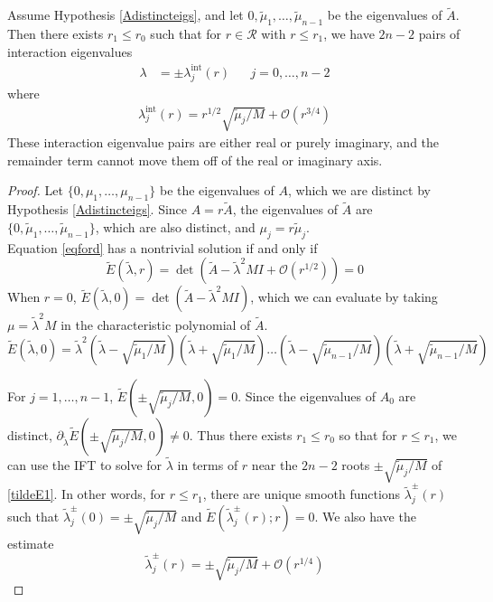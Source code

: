 \documentclass[thesis.tex]{subfiles}
\begin{document}
\begin{lemma}\label{inteigslemma}
Assume Hypothesis \ref{Adistincteigs}, and let $0, \tilde{\mu}_1, \dots, \tilde{\mu}_{n-1}$ be the eigenvalues of $\tilde{A}$. Then there exists $r_1 \leq r_0$ such that for $r \in \mathcal{R}$ with $r \leq r_1$, we have $2n - 2$ pairs of interaction eigenvalues
\begin{align*}
\lambda &= \pm \lambda^{\text{int}}_j(r) && j = 0, \dots, n-2
\end{align*}
where
\begin{align}\label{inteigsformula}
\lambda^{\text{int}}_j(r) = r^{1/2} \sqrt{\tilde{\mu}_j / M} + \mathcal{O}(r^{3/4})
\end{align}
These interaction eigenvalue pairs are either real or purely imaginary, and the remainder term cannot move them off of the real or imaginary axis.

\begin{proof}
Let $\{0, \mu_1, \dots, \mu_{n-1}\}$ be the eigenvalues of $A$, which we are distinct by Hypothesis \ref{Adistincteigs}. Since $A = r \tilde{A}$, the eigenvalues of $\tilde{A}$ are $\{0, \tilde{\mu}_1, \dots, \tilde{\mu}_{n-1}\}$, which are also distinct, and $\mu_j = r \tilde{\mu}_j$.\\

Equation \eqref{eqford} has a nontrivial solution if and only if
\[
\tilde{E}(\tilde{\lambda}, r) = \det
\left( \tilde{A} - \tilde{\lambda}^2 MI + \mathcal{O}(r^{1/2}) \right) = 0
\]
When $r = 0$, $\tilde{E}(\tilde{\lambda}, 0) = \det(\tilde{A} - \tilde{\lambda}^2 MI)$, which we can evaluate by taking $\mu = \tilde{\lambda}^2 M$ in the characteristic polynomial of $\tilde{A}$.
\begin{equation}\label{tildeE1}
\tilde{E}(\tilde{\lambda}, 0) = \tilde{\lambda}^2
\left( \tilde{\lambda} - \sqrt{\tilde{\mu}_1 / M} \right)
\left( \tilde{\lambda} + \sqrt{\tilde{\mu}_1 / M} \right) \dots
\left( \tilde{\lambda} - \sqrt{\tilde{\mu}_{n-1} / M} \right)
\left( \tilde{\lambda} + \sqrt{\tilde{\mu}_{n-1} / M} \right)
\end{equation}

For $j = 1, \dots, n-1$, $\tilde{E}(\pm \sqrt{\tilde{\mu}_j / M}, 0) = 0$. Since the eigenvalues of $A_0$ are distinct, $\partial_{\tilde{\lambda}} \tilde{E}(\pm \sqrt{\tilde{\mu}_j / M}, 0) \neq 0$. Thus there exists $r_1 \leq r_0$ so that for $r \leq r_1$, we can use the IFT to solve for $\tilde{\lambda}$ in terms of $r$ near the $2n-2$ roots $\pm \sqrt{\tilde{\mu}_j / M}$ of \eqref{tildeE1}. In other words, for $r \leq r_1$, there are unique smooth functions $\tilde{\lambda}_j^\pm(r)$ such that $\tilde{\lambda}_j^\pm(0) = \pm \sqrt{\tilde{\mu}_j / M}$ and $\tilde{E}(\tilde{\lambda}_j^\pm(r); r) = 0$. We also have the estimate
\[
\tilde{\lambda}_j^\pm(r) = \pm \sqrt{\tilde{\mu}_j/ M} + \mathcal{O}(r^{1/4})
\]


\end{proof}
\end{lemma}
\end{document}
